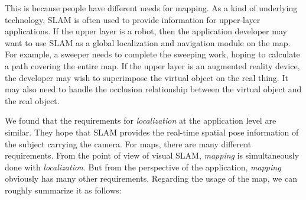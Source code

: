 This is because people have different needs for mapping. As a kind of underlying technology, SLAM is often used to provide information for upper-layer applications. If the upper layer is a robot, then the application developer may want to use SLAM as a global localization and navigation module on the map. For example, a sweeper needs to complete the sweeping work, hoping to calculate a path covering the entire map. If the upper layer is an augmented reality device, the developer may wish to superimpose the virtual object on the real thing. It may also need to handle the occlusion relationship between the virtual object and the real object.

We found that the requirements for \textit{localization} at the application level are similar. They hope that SLAM provides the real-time spatial pose information of the subject carrying the camera. For maps, there are many different requirements. From the point of view of visual SLAM, \textit{mapping} is simultaneously done with \textit{localization}. But from the perspective of the application, \textit{mapping} obviously has many other requirements. Regarding the usage of the map, we can roughly summarize it as follows:

